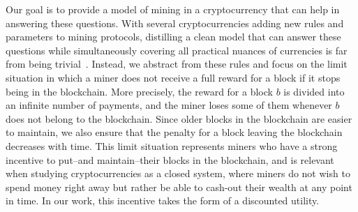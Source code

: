 Our goal is to provide a model of mining in a cryptocurrency that can help in answering these questions. 
With several cryptocurrencies adding new rules and parameters to mining protocols, distilling a clean model that can answer these questions while simultaneously covering 
all practical nuances of currencies is far from being trivial~\cite{mininggames:2016}. 
Instead, 
we abstract from these rules and focus on the limit situation in which a miner does not receive a full reward for a block if it stops being in the blockchain. 
More precisely, the reward for a block $b$ is divided into an infinite number of payments, and the miner loses some of them whenever $b$ does not belong to the blockchain. 
Since older blocks in the blockchain are easier to maintain, we also ensure that the penalty for a block leaving the blockchain decreases with time. 
This limit situation represents miners who have a strong incentive to put--and maintain--their blocks in the blockchain, and is relevant when studying cryptocurrencies 
as a closed system, where miners do 
not wish to spend money right away but rather be able to cash-out their wealth at any point in time. 
%
%
In our work, this incentive takes the form of a discounted utility.

